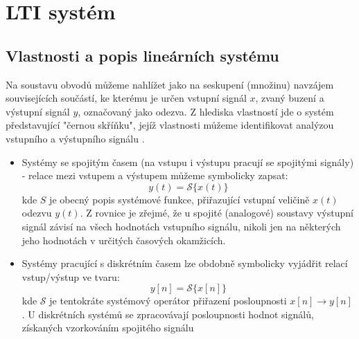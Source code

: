 \setchaptertoc
\chapter{LTI systém}

  \section{Vlastnosti a popis lineárních systému}


    Na soustavu obvodů můžeme nahlížet jako na seskupení (množinu) navzájem souvisejících součástí, 
    ke kterému je určen vstupní signál $x$, zvaný buzení a výstupní signál $y$, označovaný jako 
    odezva. Z hlediska vlastností jde o systém představující "černou skříňku", jejíž vlastnosti 
    můžeme identifikovat analýzou vstupního a výstupního signálu \cite{Bicak}.        
    \begin{itemize}
      \item Systémy se spojitým časem (na vstupu i výstupu pracují se spojitými signály) - relace  
            mezi vstupem a výstupem můžeme symbolicky zapsat:
            \begin{equation}\label{sas:eq_spojity_system}
              y(t)=\mathcal{S}\{x(t)\}
            \end{equation}
            kde $S$ je obecný popis systémové funkce, přiřazující vstupní veličině $x(t)$ odezvu 
            $y(t)$. Z rovnice je zřejmé, že u spojité (analogové) soustavy výstupní signál závisí 
            na všech hodnotách vstupního signálu, nikoli jen na některých jeho hodnotách v určitých 
            časových okamžicích.
      \item Systémy pracující s diskrétním časem lze obdobně symbolicky vyjádřit relací  
            vstup/výstup ve tvaru:
            \begin{equation}\label{sas:eq_dis_system}
              y[n]=\mathcal{S}\{x[n]\}
            \end{equation}
            kde $\mathcal{S}$ je tentokráte systémový operátor přiřazení posloupnosti 
            $x[n]\rightarrow y[n]$. U diskrétních systémů se zpracovávají posloupnosti hodnot 
            signálů, získaných vzorkováním spojitého signálu
    \end{itemize}
    
